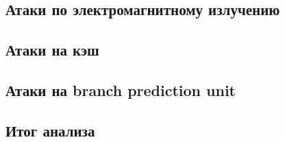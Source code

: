 \subsection{Атаки по электромагнитному излучению}
\clearpage

\subsection{Атаки на кэш}
\clearpage

\subsection{Атаки на branch prediction unit}
\clearpage

\subsection{Итог анализа}
\clearpage
